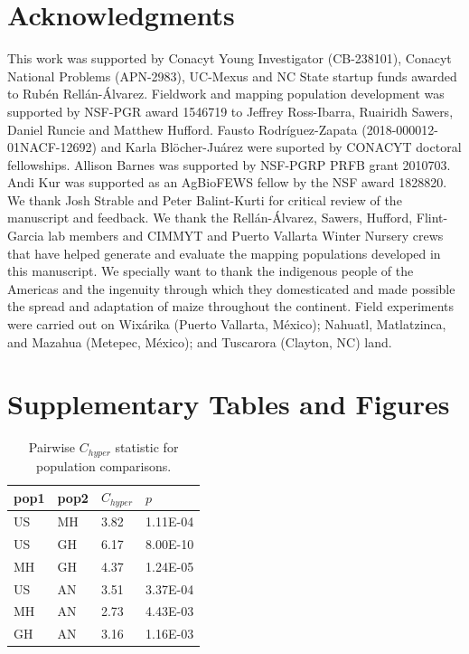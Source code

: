 \documentclass[9pt,twocolumn,twoside,lineno]{BioRxiv}
\begin{document}
\section{Acknowledgments}
This work was supported by Conacyt Young Investigator (CB-238101), Conacyt National Problems (APN-2983), UC-Mexus and NC State startup funds awarded to Rubén Rellán-Álvarez. 
Fieldwork and mapping population development was supported by NSF-PGR award 1546719 to Jeffrey Ross-Ibarra, Ruairidh Sawers, Daniel Runcie and Matthew Hufford.  
Fausto Rodríguez-Zapata (2018-000012-01NACF-12692) and Karla Blöcher-Juárez were suported by CONACYT doctoral fellowships.
Allison Barnes was supported by NSF-PGRP PRFB grant 2010703. 
Andi Kur was supported as an AgBioFEWS fellow by the NSF award 1828820.
We thank Josh Strable and Peter Balint-Kurti for critical review of the manuscript and feedback. 
We thank the Rell\'an-\'Alvarez, Sawers, Hufford, Flint-Garcia lab members and CIMMYT and Puerto Vallarta Winter Nursery crews that have helped generate and evaluate the mapping populations developed in this manuscript.
We specially want to thank the indigenous people of the Americas and the  ingenuity through which they domesticated and made possible the spread and adaptation of maize throughout the continent. 
Field experiments were carried out on Wix\'arika (Puerto Vallarta, M\'exico); Nahuatl, Matlatzinca, and Mazahua (Metepec, M\'exico); and Tuscarora (Clayton, NC) land.
\label{sec:acknowledgments}



\clearpage

\onecolumn

\section*{Supplementary Tables and Figures}

\begin{table}[h!]

\begin{tabular}{@{}llll@{}}
\toprule
pop1 & pop2 & $C_{hyper}$   & $p$  \\ \midrule
US   & MH   & 3.82 & 1.11E-04 \\
US   & GH   & 6.17 & 8.00E-10 \\
MH   & GH   & 4.37 & 1.24E-05 \\
US   & AN   & 3.51 & 3.37E-04 \\
MH   & AN   & 2.73 & 4.43E-03 \\
GH   & AN   & 3.16 & 1.16E-03 \\ \bottomrule
\end{tabular}
\label{tab:table1}
\caption{Pairwise $C_{hyper}$ statistic for population comparisons.}
\end{table}
\end{document}
